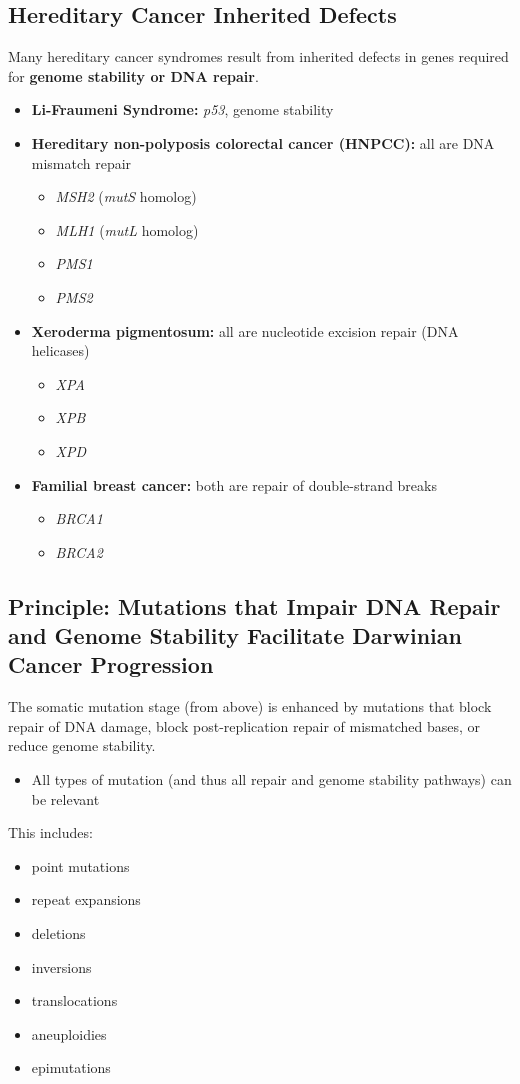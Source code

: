 \documentclass[10pt]{article}
\begin{document}
\subsection*{Hereditary Cancer Inherited Defects}
Many hereditary cancer syndromes result from inherited defects in genes required for \textbf{genome stability or DNA repair}.
\begin{itemize}
	\item \textbf{Li-Fraumeni Syndrome:} \textit{p53}, genome stability
	\item \textbf{Hereditary non-polyposis colorectal cancer (HNPCC):} all are DNA mismatch repair
	\begin{itemize}
        \item \textit{MSH2} (\textit{mutS} homolog)
        \item \textit{MLH1} (\textit{mutL} homolog)
        \item \textit{PMS1}
        \item \textit{PMS2}
    \end{itemize}
    \item \textbf{Xeroderma pigmentosum:} all are nucleotide excision repair (DNA helicases)
    \begin{itemize}
        \item \textit{XPA}
        \item \textit{XPB}
        \item \textit{XPD}
    \end{itemize}
    \item \textbf{Familial breast cancer:} both are repair of double-strand breaks
    \begin{itemize}
        \item \textit{BRCA1}
        \item \textit{BRCA2}
    \end{itemize}
\end{itemize}

\pagebreak
\subsection*{Principle: Mutations that Impair DNA Repair and Genome Stability Facilitate Darwinian Cancer Progression}
The somatic mutation stage (from above) is enhanced by mutations that block repair of DNA damage, block post-replication repair of mismatched bases, or reduce genome stability.
\begin{itemize}
	\item All types of mutation (and thus all repair and genome stability pathways) can be relevant
\end{itemize}
This includes:
\begin{itemize}
	\item point mutations
	\item repeat expansions
	\item deletions
	\item inversions
	\item translocations
	\item aneuploidies
	\item epimutations
\end{itemize}
\end{document}
